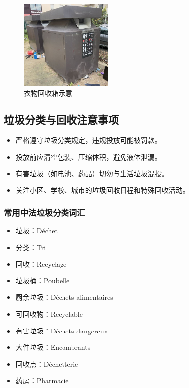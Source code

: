 \begin{figure}[h]
    \centering
    \includegraphics[width=0.4\textwidth]{images/garbage_bin_clothes.jpg}
    \caption{衣物回收箱示意}
\end{figure}

\subsection{垃圾分类与回收注意事项}
\begin{itemize}
    \item 严格遵守垃圾分类规定，违规投放可能被罚款。
    \item 投放前应清空包装、压缩体积，避免液体泄漏。
    \item 有害垃圾（如电池、药品）切勿与生活垃圾混投。
    \item 关注小区、学校、城市的垃圾回收日程和特殊回收活动。
\end{itemize}

\subsubsection{常用中法垃圾分类词汇}
\begin{itemize}
    \item 垃圾：Déchet
    \item 分类：Tri
    \item 回收：Recyclage
    \item 垃圾桶：Poubelle
    \item 厨余垃圾：Déchets alimentaires
    \item 可回收物：Recyclable
    \item 有害垃圾：Déchets dangereux
    \item 大件垃圾：Encombrants
    \item 回收点：Déchetterie
    \item 药房：Pharmacie
\end{itemize}

